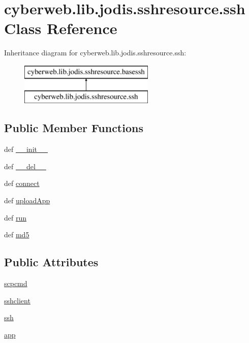 \hypertarget{classcyberweb_1_1lib_1_1jodis_1_1sshresource_1_1ssh}{\section{cyberweb.\-lib.\-jodis.\-sshresource.\-ssh \-Class \-Reference}
\label{classcyberweb_1_1lib_1_1jodis_1_1sshresource_1_1ssh}
}
\-Inheritance diagram for cyberweb.\-lib.\-jodis.\-sshresource.\-ssh\-:\begin{figure}[H]
\begin{center}
\leavevmode
\includegraphics[height=2.000000cm]{classcyberweb_1_1lib_1_1jodis_1_1sshresource_1_1ssh}
\end{center}
\end{figure}
\subsection*{\-Public \-Member \-Functions}
\begin{DoxyCompactItemize}
\item 
def \hyperlink{classcyberweb_1_1lib_1_1jodis_1_1sshresource_1_1ssh_adc8a8994fccc5ba9dfce97fd3ce38dc3}{\-\_\-\-\_\-init\-\_\-\-\_\-}
\item 
def \hyperlink{classcyberweb_1_1lib_1_1jodis_1_1sshresource_1_1ssh_a0532fb96e97e193e2c0dfa7ec19f62ea}{\-\_\-\-\_\-del\-\_\-\-\_\-}
\item 
def \hyperlink{classcyberweb_1_1lib_1_1jodis_1_1sshresource_1_1ssh_aa4d994479600e19a5af2240e42348520}{connect}
\item 
def \hyperlink{classcyberweb_1_1lib_1_1jodis_1_1sshresource_1_1ssh_a7885fad576ca9c904374e660c6b66dc4}{upload\-App}
\item 
def \hyperlink{classcyberweb_1_1lib_1_1jodis_1_1sshresource_1_1ssh_ad22397ccd13e1bb684b9f4b736b2e853}{run}
\item 
def \hyperlink{classcyberweb_1_1lib_1_1jodis_1_1sshresource_1_1ssh_a9db7c790ddb14765b0c9508f0ed3a3a0}{md5}
\end{DoxyCompactItemize}
\subsection*{\-Public \-Attributes}
\begin{DoxyCompactItemize}
\item 
\hyperlink{classcyberweb_1_1lib_1_1jodis_1_1sshresource_1_1ssh_aa61bfc003777fec2daff915f24551ea0}{scpcmd}
\item 
\hyperlink{classcyberweb_1_1lib_1_1jodis_1_1sshresource_1_1ssh_a11f1c20219bcae465b295889c2274802}{sshclient}
\item 
\hyperlink{classcyberweb_1_1lib_1_1jodis_1_1sshresource_1_1ssh_a1d8854c9f493722af9059ec526aa1afd}{ssh}
\item 
\hyperlink{classcyberweb_1_1lib_1_1jodis_1_1sshresource_1_1ssh_a6f4691138b98d7f88732eeadb586b6a5}{app}
\end{DoxyCompactItemize}


